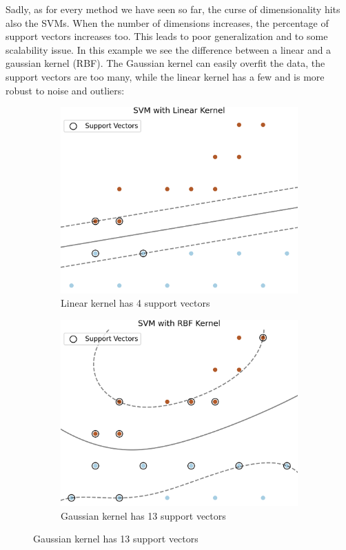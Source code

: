 \documentclass[../main.tex]{subfiles}
\begin{document}
Sadly, as for every method we have seen so far, the curse of dimensionality hits also the SVMs. When the number of dimensions increases, the percentage of support vectors increases too. This leads to poor generalization and to some scalability issue.
In this example we see the difference between a linear and a gaussian kernel (RBF). The Gaussian kernel can easily overfit the data, the support vectors are too many, while the linear kernel has a few and is more robust to noise and outliers:
\begin{figure}[htbp]
    \centering
    \begin{subfigure}{0.5\textwidth}
        \includegraphics[width=\textwidth]{images/SVM_linear.png}
        \caption{Linear kernel has 4 support vectors}
    \end{subfigure}%
    \begin{subfigure}{0.5\textwidth}
        \includegraphics[width=\textwidth]{images/SVM_rbf.png}
        \caption{Gaussian kernel has 13 support vectors}
    \end{subfigure}
\end{figure}
\end{document}
